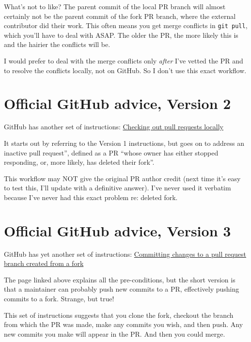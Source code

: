 \documentclass[
]{book}
\begin{document}
What's not to like? The parent commit of the local PR branch will almost certainly not be the parent commit of the fork PR branch, where the external contributor did their work. This often means you get merge conflicts in \texttt{git\ pull}, which you'll have to deal with ASAP. The older the PR, the more likely this is and the hairier the conflicts will be.

I would prefer to deal with the merge conflicts only \emph{after} I've vetted the PR and to resolve the conflicts locally, not on GitHub. So I don't use this exact workflow.

\section{Official GitHub advice, Version 2}\label{official-github-advice-version-2}

GitHub has another set of instructions: \href{https://help.github.com/articles/checking-out-pull-requests-locally/}{Checking out pull requests locally}

It starts out by referring to the Version 1 instructions, but goes on to address an inactive pull request'', defined as a PR ``whose owner has either stopped responding, or, more likely, has deleted their fork''.

This workflow may NOT give the original PR author credit (next time it's easy to test this, I'll update with a definitive answer). I've never used it verbatim because I've never had this exact problem re: deleted fork.

\section{Official GitHub advice, Version 3}\label{official-github-advice-version-3}

GitHub has yet another set of instructions: \href{https://help.github.com/articles/committing-changes-to-a-pull-request-branch-created-from-a-fork/}{Committing changes to a pull request branch created from a fork}

The page linked above explains all the pre-conditions, but the short version is that a maintainer can probably push new commits to a PR, effectively pushing commits to a fork. Strange, but true!

This set of instructions suggests that you clone the fork, checkout the branch from which the PR was made, make any commits you wish, and then push. Any new commits you make will appear in the PR. And then you could merge.
\end{document}
